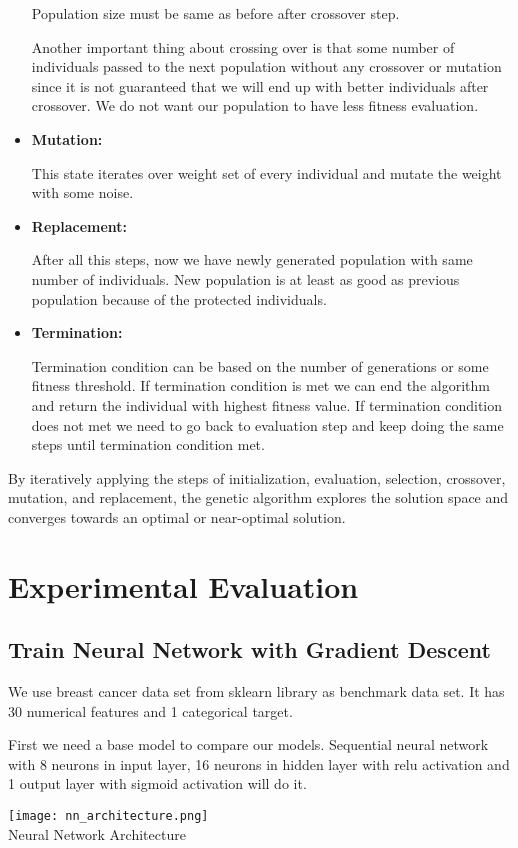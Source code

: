 \documentclass[conference]{IEEEtran}
\begin{document}
\begin{itemize}
    Population size must be same as before after crossover step.

    Another important thing about crossing over is that some number of individuals passed to the next population without any crossover or mutation since it is not guaranteed that we will end up with better individuals after crossover. We do not want our population to have less fitness evaluation.

    
    \item \textbf{Mutation:}
    
    This state iterates over weight set of every individual and mutate the weight with some noise.
    
    \item \textbf{Replacement:}

    After all this steps, now we have newly generated population with same number of individuals. New population is at least as good as previous population because of the protected individuals.
    
    
    \item \textbf{Termination:}

    Termination condition can be based on the number of generations or some fitness threshold. If termination condition is met we can end the algorithm and return the individual with highest fitness value. If termination condition does not met we need to go back to evaluation step and keep doing the same steps until termination condition met.
\end{itemize}

By iteratively applying the steps of initialization, evaluation, selection, crossover, mutation, and replacement, the genetic algorithm explores the solution space and converges towards an optimal or near-optimal solution.

\section{\textbf{Experimental Evaluation}}
\subsection{Train Neural Network with Gradient Descent}

We use breast cancer data set from sklearn library as benchmark data set. It has 30 numerical features and 1 categorical target. 

First we need a base model to compare our models. Sequential neural network with 8 neurons in input layer, 16 neurons in hidden layer with relu activation and 1 output layer with sigmoid activation will do it.
\begin{center}
\texttt{[image: nn\_architecture.png]}\\
\footnotesize{Neural Network Architecture}
\end{center}\\ 
\end{document}
